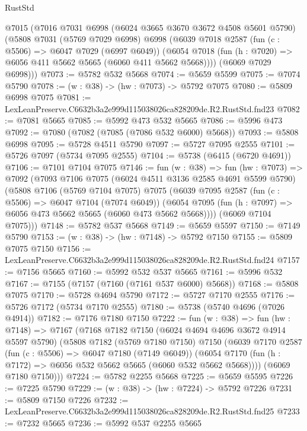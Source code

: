 \begin{lexlean}{RustStd}
\begin{coremodule}
  @7015
    (@7016
      @7031
      @6998
      (@6024 @3665 @3670 @3672 @4508 @5601 @5790)
      (@5808
        @7031
        (@5769 @7029 @6998)
        @6998
        (@6039
          @7018
          @2587
          (fun (c : @5506) => @6047 @7029 (@6997 @6049))
          (@6054 @7018 (fun (h : @7020) => @6056 @411 @5662 @5665 (@6060 @411 @5662 @5668))))
        (@6069 @7029 @6998)))
@7073 := @5782 @532 @5668
@7074 := @5659 @5599
@7075 := @7074 @5790
@7078 := (w : @38) -> (hw : @7073) -> @5792 @7075
@7080 := @5809 @6998 @7075
@7081 := LexLeanPreserve.C6632b3a2e999d115038026ca828209de.R2.RustStd.fnd23
@7082 := @7081 @5665
@7085 := @5992 @473 @532 @5665
@7086 := @5996 @473
@7092 := @7080 (@7082 (@7085 (@7086 @532 @6000) @5668))
@7093 := @5808 @6998
@7095 := @5728 @4511 @5790
@7097 := @5727 @7095 @2555
@7101 := @5726 @7097 (@5734 @7095 @2555)
@7104 := @5738 (@6415 (@6720 @4691))
@7106 := @7101 @7104 @7075
@7146 := fun (w : @38) =>
  fun (hw : @7073) =>
  @7092
    (@7093
      @7106
      @7075
      (@6024 @4511 @3136 @2585 @4691 @5599 @5790)
      (@5808
        @7106
        (@5769 @7104 @7075)
        @7075
        (@6039
          @7095
          @2587
          (fun (c : @5506) => @6047 @7104 (@7074 @6049))
          (@6054 @7095 (fun (h : @7097) => @6056 @473 @5662 @5665 (@6060 @473 @5662 @5668))))
        (@6069 @7104 @7075)))
@7148 := @5782 @537 @5668
@7149 := @5659 @5597
@7150 := @7149 @5790
@7153 := (w : @38) -> (hw : @7148) -> @5792 @7150
@7155 := @5809 @7075 @7150
@7156 := LexLeanPreserve.C6632b3a2e999d115038026ca828209de.R2.RustStd.fnd24
@7157 := @7156 @5665
@7160 := @5992 @532 @537 @5665
@7161 := @5996 @532
@7167 := @7155 (@7157 (@7160 (@7161 @537 @6000) @5668))
@7168 := @5808 @7075
@7170 := @5728 @4694 @5790
@7172 := @5727 @7170 @2555
@7176 := @5726 @7172 (@5734 @7170 @2555)
@7180 := @5738 (@5740 @4696 (@7026 @4914))
@7182 := @7176 @7180 @7150
@7222 := fun (w : @38) =>
  fun (hw : @7148) =>
  @7167
    (@7168
      @7182
      @7150
      (@6024 @4694 @4696 @3672 @4914 @5597 @5790)
      (@5808
        @7182
        (@5769 @7180 @7150)
        @7150
        (@6039
          @7170
          @2587
          (fun (c : @5506) => @6047 @7180 (@7149 @6049))
          (@6054 @7170 (fun (h : @7172) => @6056 @532 @5662 @5665 (@6060 @532 @5662 @5668))))
        (@6069 @7180 @7150)))
@7224 := @5782 @2255 @5668
@7225 := @5659 @5595
@7226 := @7225 @5790
@7229 := (w : @38) -> (hw : @7224) -> @5792 @7226
@7231 := @5809 @7150 @7226
@7232 := LexLeanPreserve.C6632b3a2e999d115038026ca828209de.R2.RustStd.fnd25
@7233 := @7232 @5665
@7236 := @5992 @537 @2255 @5665

\end{coremodule}
\end{lexlean}
